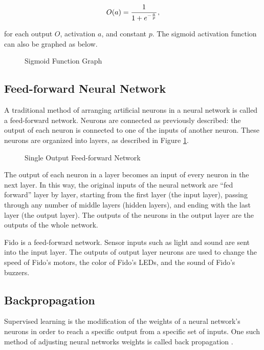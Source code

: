 \begin{equation}
	O(a) = \cfrac{1}{1+e^{-\frac{a}{p}}}
	\,,
\end{equation}

\noindent for each output $O$, activation $a$, and constant $p$.
The sigmoid activation function can also be graphed as below.

\begin{figure}[ht]
	\centering
	
	\caption{Sigmoid Function Graph}
\end{figure}

\subsection{Feed-forward Neural Network}

A traditional method of arranging artificial neurons in a neural network is called a feed-forward network.
Neurons are connected as previously described: the output of each neuron is connected to one of the inputs of another neuron.
These neurons are organized into layers, as described in Figure \ref{fig:feedforward}.

\begin{figure}[ht]
	\centering
	
	\caption{Single Output Feed-forward Network}
	\label{fig:feedforward}
\end{figure}

The output of each neuron in a layer becomes an input of every neuron in the next layer.
In this way, the original inputs of the neural network are ``fed forward'' layer by layer, starting from the first layer (the input layer), passing through any number of middle layers (hidden layers), and ending with the last layer (the output layer).
The outputs of the neurons in the output layer are the outputs of the whole network.

Fido is a feed-forward network.
Sensor inputs such as light and sound are sent into the input layer.
The outputs of output layer neurons are used to change the speed of Fido's motors, the color of Fido's LEDs, and the sound of Fido's buzzers.

\subsection{Backpropagation}

Supervised learning is the modification of the weights of a neural network's neurons in order to reach a specific output from a specific set of inputs.
One such method of adjusting neural networks weights is called back propagation \cite{werbos}.

